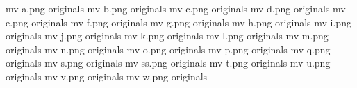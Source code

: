 mv a.png originals
mv b.png originals
mv c.png originals
mv d.png originals
mv e.png originals
mv f.png originals
mv g.png originals
mv h.png originals
mv i.png originals
mv j.png originals
mv k.png originals
mv l.png originals
mv m.png originals
mv n.png originals
mv o.png originals
mv p.png originals
mv q.png originals
mv s.png originals
mv ss.png originals
mv t.png originals
mv u.png originals
mv v.png originals
mv w.png originals
